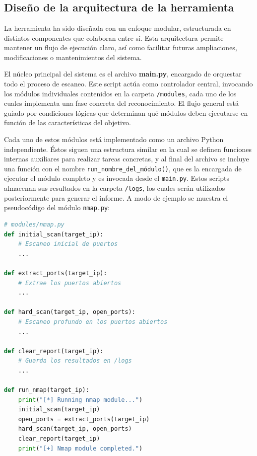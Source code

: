 \chapter{\implementationdevelopmentname}
\newpage
\begin{parskipenv}
\section{Diseño de la arquitectura de la herramienta}
La herramienta ha sido diseñada con un enfoque modular, estructurada en distintos componentes que colaboran entre sí. Esta arquitectura permite mantener un flujo de ejecución claro, así como facilitar futuras ampliaciones, modificaciones o mantenimientos del sistema.

El núcleo principal del sistema es el archivo \textbf{main.py}, encargado de orquestar todo el proceso de escaneo. Este script actúa como controlador central, invocando los módulos individuales contenidos en la carpeta \texttt{/modules}, cada uno de los cuales implementa una fase concreta del reconocimiento. El flujo general está guiado por condiciones lógicas que determinan qué módulos deben ejecutarse en función de las características del objetivo.

Cada uno de estos módulos está implementado como un archivo Python independiente. Éstos siguen una estructura similar en la cual se definen funciones internas auxiliares para realizar tareas concretas, y al final del archivo se incluye una función con el nombre \texttt{run\_nombre\_del\_módulo()}, que es la encargada de ejecutar el módulo completo y es invocada desde el \texttt{main.py}. Estos scripts almacenan sus resultados en la carpeta \texttt{/logs}, los cuales serán utilizados posteriormente para generar el informe. A modo de ejemplo se muestra el pseudocódigo del módulo \texttt{nmap.py}:

\begin{lstlisting}[language=Python, caption={Estructura general de un módulo}]
# modules/nmap.py
def initial_scan(target_ip):
    # Escaneo inicial de puertos
    ...

def extract_ports(target_ip):
    # Extrae los puertos abiertos
    ...

def hard_scan(target_ip, open_ports):
    # Escaneo profundo en los puertos abiertos
    ...

def clear_report(target_ip):
    # Guarda los resultados en /logs
    ...

def run_nmap(target_ip):
    print("[*] Running nmap module...")
    initial_scan(target_ip)
    open_ports = extract_ports(target_ip)
    hard_scan(target_ip, open_ports)
    clear_report(target_ip)
    print("[+] Nmap module completed.")
\end{lstlisting}


\end{parskipenv}
